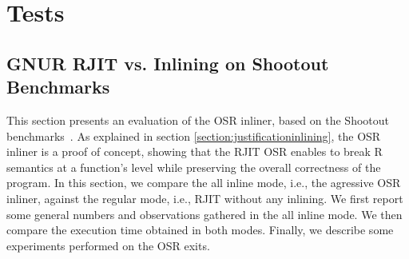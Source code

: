 \section{Tests}
\subsection{GNUR RJIT vs. Inlining on Shootout Benchmarks}

     


This section presents an evaluation of the OSR inliner, based on the Shootout benchmarks~\cite{Shootout}.
As explained in section \ref{section:justificationinlining}, the OSR inliner is a proof of concept, showing that the RJIT OSR enables to break R semantics at a function's level while preserving the overall correctness of the program.
In this section, we compare the all inline mode, i.e., the agressive OSR inliner, against the regular mode, i.e., RJIT without any inlining.
We first report some general numbers and observations gathered in the all inline mode. 
We then compare the execution time obtained in both modes.
Finally, we describe some experiments performed on the OSR exits.\\


